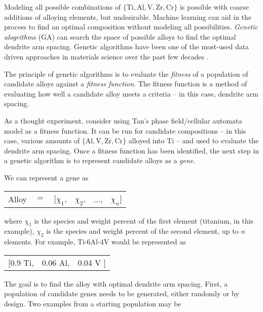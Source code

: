 Modeling all possible combinations of $\{\text{Ti},\text{Al}, \text{V}, \text{Zr}, \text{Cr}\}$ is possible with coarse additions of alloying elements, but undesirable. Machine learning can aid in the process to find an optimal composition without modeling all possibilities. \textit{Genetic alogrithms} (GA) can search the space of possible alloys to find the optimal dendrite arm spacing. Genetic algorithms have been one of the most-used data driven approaches in materials science over the past few decades \cite{Morris1996, Ho1998, Wolf2000, Johannesson2002, Stucke2003, Hart2005, Oganov2006}.

The principle of genetic algorithms is to evaluate the \textit{fitness} of a population of candidate alloys against a \textit{fitness function}. The fitness function is a method of evaluating how well a candidate alloy meets a criteria -- in this case, dendrite arm spacing. 

As a thought experiment, consider using Tan's phase field/cellular automata model as a fitness function. It can be run for candidate compositions -- in this case, various amounts of $\{\text{Al}, \text{V}, \text{Zr}, \text{Cr}\}$ alloyed into Ti -- and used to evaluate the dendrite arm spacing. Once a fitness function has been identified, the next step in a genetic algorithm is to represent candidate alloys as a \textit{gene}. 

We can represent a gene as 

\begin{table}[h!]
\begin{tabular}{cccccc}
	Alloy & $=$ & [$\chi_1$, & $\chi_2$, & $\ldots$, & $\chi_n$] \\
\end{tabular}
\end{table}
where $\chi_1$ is the species and weight percent of the first element (titanium, in this example), $\chi_2$ is the species and weight percent of the second element, up to $n$ elements. For example, Ti-6Al-4V would be represented as

\begin{table}[h!]
\begin{tabular}{ccc}
	 [0.9 Ti,  & 0.06 Al, & 0.04 V ] \\
\end{tabular}
\end{table}
The goal is to find the alloy with optimal dendrite arm spacing. First, a population of candidate genes needs to be generated, either randomly or by design. Two examples from a starting population may be

